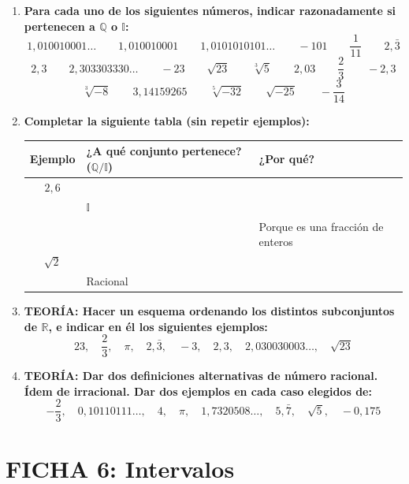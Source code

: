 \documentclass[10pt, a4paper]{article}
\begin{document}
\begin{enumerate}
    \item \textbf{Para cada uno de los siguientes números, indicar razonadamente si pertenecen a $\mathbb{Q}$ o $\mathbb{I}$:}
    \[ 1{,}010010001\dots \qquad 1{,}010010001 \qquad 1{,}0101010101\dots \qquad -101 \qquad \frac{1}{11} \qquad 2{,}\bar{3} \]
    \[ 2{,}3 \qquad 2{,}303303330\dots \qquad -23 \qquad \sqrt{23} \qquad \sqrt[3]{5} \qquad 2{,}03 \qquad \frac{2}{3} \qquad -2{,}3 \]
    \[ \sqrt[3]{-8} \qquad 3{,}14159265 \qquad \sqrt[5]{-32} \qquad \sqrt{-25} \qquad -\frac{3}{14} \]

    \item \textbf{Completar la siguiente tabla (sin repetir ejemplos):}
    \begin{center}
    \begin{tabularx}{\textwidth}{|c|X|X|}
    \hline
    \textbf{Ejemplo} & \textbf{¿A qué conjunto pertenece? ($\mathbb{Q}/\mathbb{I}$)} & \textbf{¿Por qué?} \\ \hline
    $2{,}6$ & & \\ \hline
    & $\mathbb{I}$ & \\ \hline
    & & Porque es una fracción de enteros \\ \hline
    $\sqrt{2}$ & & \\ \hline
    & Racional & \\ \hline
    \end{tabularx}
    \end{center}

    \item \textbf{TEORÍA: Hacer un esquema ordenando los distintos subconjuntos de $\mathbb{R}$, e indicar en él los siguientes ejemplos:}
    \[ 23, \quad \frac{2}{3}, \quad \pi, \quad 2{,}\bar{3}, \quad -3, \quad 2{,}3, \quad 2{,}030030003\dots, \quad \sqrt{23} \]

    \item \textbf{TEORÍA: Dar dos definiciones alternativas de número racional. Ídem de irracional. Dar dos ejemplos en cada caso elegidos de:}
    \[ -\frac{2}{3}, \quad 0{,}10110111\dots, \quad 4, \quad \pi, \quad 1{,}7320508\dots, \quad 5{,}\bar{7}, \quad \sqrt{5}, \quad -0{,}175 \]
\end{enumerate}

\newpage

\section*{FICHA 6: Intervalos}
\end{document}
